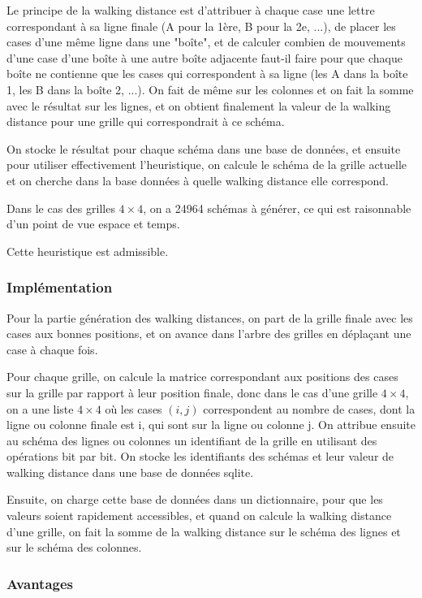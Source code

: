 \documentclass[a4paper, 12pt]{article}
\begin{document}
Le principe de la walking distance est d'attribuer à chaque case une lettre correspondant à sa ligne finale (A pour la 1ère, B pour la 2e, ...), de placer les cases d'une même ligne dans une "boîte", et de calculer combien de mouvements d'une case d'une boîte à une autre boîte adjacente faut-il faire pour que chaque boîte ne contienne que les cases qui correspondent à sa ligne (les A dans la boîte 1, les B dans la boîte 2, ...).
On fait de même sur les colonnes et on fait la somme avec le résultat sur les lignes, et on obtient finalement la valeur de la walking distance pour une grille qui correspondrait à ce schéma.

On stocke le résultat pour chaque schéma dans une base de données, et ensuite pour utiliser effectivement l'heuristique, on calcule le schéma de la grille actuelle et on cherche dans la base données à quelle walking distance elle correspond.

Dans le cas des grilles $4 \times 4$, on a 24964 schémas à générer, ce qui est raisonnable d'un point de vue espace et temps.

Cette heuristique est admissible.

\subsubsection{Implémentation}

Pour la partie génération des walking distances, on part de la grille finale avec les cases aux bonnes positions, et on avance dans l'arbre des grilles en déplaçant une case à chaque fois.

Pour chaque grille, on calcule la matrice correspondant aux positions des cases sur la grille par rapport à leur position finale, donc dans le cas d'une grille $4 \times 4$, on a une liste $4 \times 4$ où les cases $(i, j)$ correspondent au nombre de cases, dont la ligne ou colonne finale est i, qui sont sur la ligne ou colonne j.
On attribue ensuite au schéma des lignes ou colonnes un identifiant de la grille en utilisant des opérations bit par bit.
On stocke les identifiants des schémas et leur valeur de walking distance dans une base de données sqlite.

Ensuite, on charge cette base de données dans un dictionnaire, pour que les valeurs soient rapidement accessibles, et quand on calcule la walking distance d'une grille, on fait la somme de la walking distance sur le schéma des lignes et sur le schéma des colonnes.

\subsubsection{Avantages}
\end{document}
